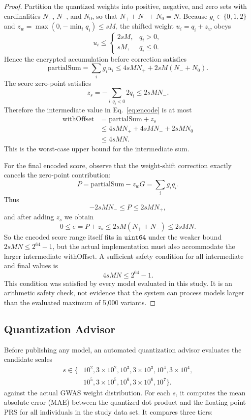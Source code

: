 \documentclass[10pt]{article}
\begin{document}
{\renewcommand{\qedsymbol}{}
\begin{proof}
Partition the quantized weights into positive, negative, and zero sets with
cardinalities $N_{+}$, $N_{-}$, and $N_{0}$, so that $N_{+}+N_{-}+N_{0}=N$.
Because $g_i \in \{0,1,2\}$ and $z_w=\max(0,-\min_i q_i) \leq sM$, the shifted weight
$u_i = q_i + z_w$ obeys
\[
u_i \leq
\begin{cases}
2 s M, & q_i > 0,\\
s M, & q_i \leq 0.
\end{cases}
\]
Hence the encrypted accumulation before correction satisfies
\[
\mathrm{partialSum} = \sum_i g_i u_i
\leq 4 s M N_{+} + 2 s M (N_{-}+N_{0}).
\]
The score zero-point satisfies
\[
z_s = -\sum_{i:q_i<0} 2 q_i \leq 2 s M N_{-}.
\]
Therefore the intermediate value in Eq.~\ref{eq:encode} is at most
\begin{align*}
\mathrm{withOffset} &= \mathrm{partialSum} + z_s \\
&\leq 4sMN_{+}+4sMN_{-}+2sMN_{0} \\
&\leq 4sMN.
\end{align*}
This is the worst-case upper bound for the intermediate sum.

For the final encoded score, observe that the weight-shift correction exactly
cancels the zero-point contribution:
\[
P = \mathrm{partialSum} - z_w G = \sum_i g_i q_i.
\]
Thus
\[
-2 s M N_{-} \leq P \leq 2 s M N_{+},
\]
and after adding $z_s$ we obtain
\[
0 \leq e = P + z_s \leq 2 s M (N_{+}+N_{-}) \leq 2 s M N.
\]
So the encoded score range itself fits in $\texttt{uint64}$ under the weaker bound
$2 s M N \leq 2^{64}-1$, but the actual implementation must also accommodate the
larger intermediate $\mathrm{withOffset}$.  A sufficient safety condition for all
intermediate and final values is
\[
4 s M N \leq 2^{64}-1.
\]
This condition was satisfied by every model evaluated in this study.  It is an
arithmetic safety check, not evidence that the system can process models larger than
the evaluated maximum of 5,000 variants.
\end{proof}}

\subsection{Quantization Advisor}
\label{sec:advisor}

Before publishing any model, an automated quantization advisor evaluates the candidate
scales
\[
\begin{aligned}
s \in \{&10^2,3{\times}10^2,10^3,3{\times}10^3,10^4,3{\times}10^4,\\
         &10^5,3{\times}10^5,10^6,3{\times}10^6,10^7\}.
\end{aligned}
\]
against the actual GWAS weight distribution.  For each $s$, it computes the mean absolute error
(MAE) between the quantized dot product and the floating-point PRS for all
individuals in the study data set.  It compares three tiers:
\end{document}

